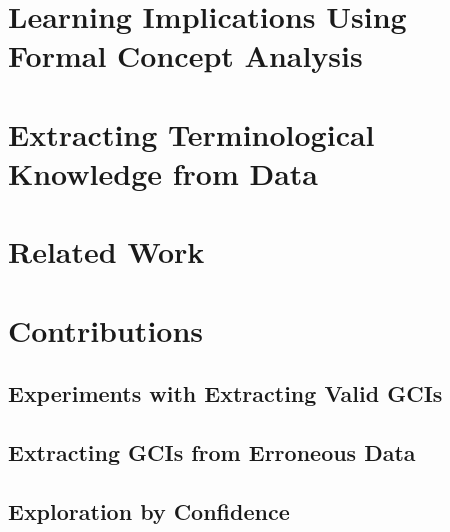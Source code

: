 
\section{Learning Implications Using Formal Concept Analysis}
\label{sec:learn-impl-using}

%

\section{Extracting Terminological Knowledge from Data}
\label{sec:extr-term-knowl}

%

\section{Related Work}
\label{sec:related-work}

%
%
%

\section{Contributions}
\label{sec:contributions}


\subsection{Experiments with Extracting Valid GCIs}
\label{sec:exper-with-extr}

\subsection{Extracting GCIs from Erroneous Data}
\label{sec:extracting-gcis-from}

\subsection{Exploration by Confidence}
\label{sec:expl-conf-2}

